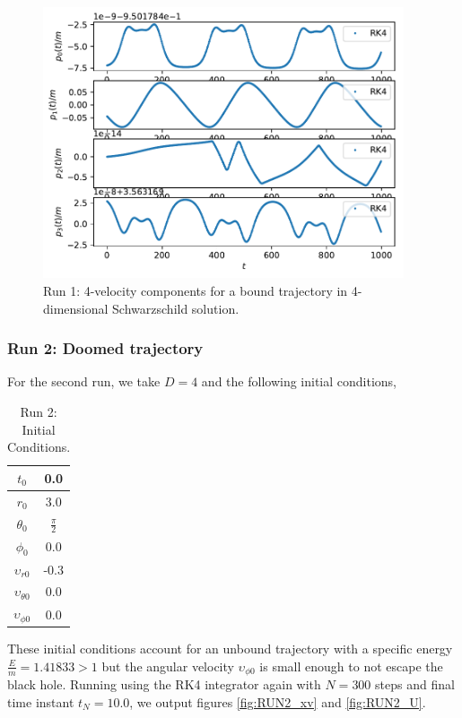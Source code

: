 \begin{figure}
	\centering
	\includegraphics[height=8cm]{Figures/U_t_Rotating.pdf}
	\caption[Run 1: 4-velocity]{Run 1: 4-velocity components for a bound trajectory in 4-dimensional Schwarzschild solution.}
	\label{fig:RUN1_U}
\end{figure}

\subsubsection{Run 2: Doomed trajectory}
For the second run, we take $D=4$ and the following initial conditions,
\begin{table}[H]
	\centering
	\begin{tabular}{|c|c|}
		\hline
		$t_0$ & 0.0 \\
		\hline
		$r_0$ & 3.0 \\
		\hline
		$\theta_0$ & $\frac{\pi}{2}$ \\
		\hline
		$\phi_0$ & 0.0 \\
		\hline
		\hline
		$\upsilon_{r0}$ & -0.3 \\
		\hline
		$\upsilon_{\theta0}$ & 0.0 \\
		\hline
		$\upsilon_{\phi0}$ & 0.0 \\
		\hline
	\end{tabular}
	\caption[Run 2: Initial Conditions]{Run 2: Initial Conditions.}
	\label{tbl:RUN2_IC}
\end{table}

These initial conditions account for an unbound trajectory with a specific energy $\frac{E}{m} = 1.41833 > 1$ but the angular velocity $\upsilon_{\phi0}$ is small enough to not escape the black hole. Running using the RK4 integrator again with $N=300$ steps and final time instant $t_{N} = 10.0$, we output figures \ref{fig:RUN2_xv} and \ref{fig:RUN2_U}.


